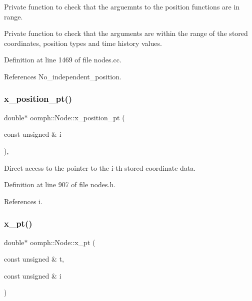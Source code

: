 Private function to check that the arguemnts to the position functions are in range. 

Private function to check that the arguments are within the range of the stored coordinates, position types and time history values. 

Definition at line 1469 of file nodes.\+cc.



References No\+\_\+independent\+\_\+position.

\mbox{\label{classoomph_1_1Node_a8456de82f2acc51c19644fc8d248e7df}} 
\subsubsection{\texorpdfstring{x\+\_\+position\+\_\+pt()}{x\_position\_pt()}}
{\footnotesize\ttfamily double$\ast$ oomph\+::\+Node\+::x\+\_\+position\+\_\+pt (\begin{DoxyParamCaption}\item[{const unsigned \&}]{i }\end{DoxyParamCaption})\hspace{0.3cm}{\ttfamily [inline]}, {\ttfamily [protected]}}



Direct access to the pointer to the i-\/th stored coordinate data. 



Definition at line 907 of file nodes.\+h.



References i.

\mbox{\label{classoomph_1_1Node_a9d28f9b05214856de687022a63e53e0f}} 
\subsubsection{\texorpdfstring{x\+\_\+pt()}{x\_pt()}}
{\footnotesize\ttfamily double$\ast$ oomph\+::\+Node\+::x\+\_\+pt (\begin{DoxyParamCaption}\item[{const unsigned \&}]{t,  }\item[{const unsigned \&}]{i }\end{DoxyParamCaption})\hspace{0.3cm}{\ttfamily [inline]}}



